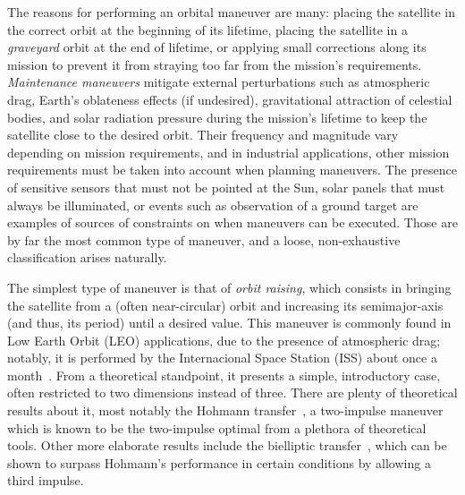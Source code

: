 The reasons for performing an orbital maneuver are many: placing the satellite in the correct orbit at the beginning of its lifetime, placing the satellite in a \textit{graveyard} orbit at the end of lifetime, or applying small corrections along its mission to prevent it from straying too far from the mission's requirements. \textit{Maintenance maneuvers} mitigate external perturbations such as atmospheric drag, Earth's oblateness effects (if undesired), gravitational attraction of celestial bodies, and solar radiation pressure during the mission's lifetime to keep the satellite close to the desired orbit. Their frequency and magnitude vary depending on mission requirements, and in industrial applications, other mission requirements must be taken into account when planning maneuvers. The presence of sensitive sensors that must not be pointed at the Sun, solar panels that must always be illuminated, or events such as observation of a ground target are examples of sources of constraints on when maneuvers can be executed. Those are by far the most common type of maneuver, and a loose, non-exhaustive classification arises naturally.

The simplest type of maneuver is that of \textit{orbit raising}, which consists in bringing the satellite from a (often near-circular) orbit and increasing its semimajor-axis (and thus, its period) until a desired value. This maneuver is commonly found in Low Earth Orbit (LEO) applications, due to the presence of atmospheric drag; notably, it is performed by the Internacional Space Station (ISS) about once a month~\cite{iss_reboost}\@. From a theoretical standpoint, it presents a simple, introductory case, often restricted to two dimensions instead of three. There are plenty of theoretical results about it, most notably the Hohmann transfer~\cite{chobotov}, a two-impulse maneuver which is known to be the two-impulse optimal from a plethora of theoretical tools. Other more elaborate results include the bielliptic transfer~\cite{chobotov}, which can be shown to surpass Hohmann's performance in certain conditions by allowing a third impulse.

